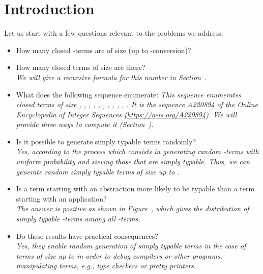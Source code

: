 \documentclass{jfp1}
\begin{document}
\section{Introduction}
\label{sec:introduction}

Let us start with a few questions relevant to the problems we address.
\begin{itemize}
\item How many closed -terms are of size  (up to -conversion)?

\item How many closed terms of size  are there?\\
\emph{We will give a recursive formula for this number in Section~.}
\item What does the following sequence enumerate:
   \emph{This
    sequence enumerates closed terms of size , , , , , , , ,
    , , .  It is the sequence A220894 of the Online Encyclopedia of Integer
    Sequences (\url{https://oeis.org/A220894}).  We will provide three ways to compute
    it (Section~). }
\item Is it possible to generate simply typable terms randomly?\\
  \emph{Yes, according to the process which consists in generating random -terms
    with uniform probability and sieving those that are simply typable.  Thus, we can
    generate random simply typable terms of size up to .}
\item Is a term starting with an abstraction more likely to be typable than a term
  starting with an application?\\
\emph{The answer is positive as shown in Figure~,
  which gives the distribution of simply typable -terms among all -terms.}
\item Do these results have practical consequences?\\
\emph{Yes, they enable random generation of simply typable terms in the case of terms of size
  up to  in order to debug compilers or other programs,
  manipulating terms, e.g., type checkers or pretty printers.}
\end{itemize}
\end{document}
